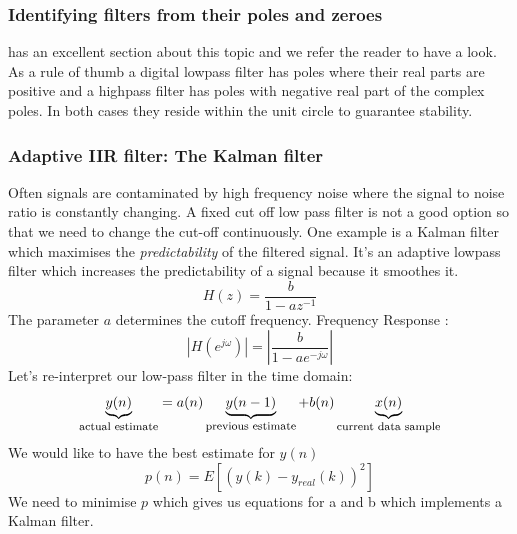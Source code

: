 \documentclass[12pt,a4paper]{article}
\begin{document}
\subsubsection{Identifying filters from their poles and zeroes}
\citet[pp.333]{Proakis1996} has an excellent section about this topic
and we refer the reader to have a look. As a rule of thumb a digital
lowpass filter has poles where their real parts are positive and a
highpass filter has poles with negative real part of the complex
poles. In both cases they reside within the unit circle to guarantee
stability.


\subsubsection{Adaptive IIR filter: The Kalman filter}
Often signals are contaminated by high frequency noise where the
signal to noise ratio is constantly changing.  A fixed cut off low
pass filter is not a good option so that we need to change the cut-off continuously.
One example is a Kalman filter which maximises the
\textsl{predictability} of the filtered signal. It's an adaptive lowpass filter
which increases the predictability of a signal because it smoothes it.
\begin{equation} 
H(z) = \frac{b}{1 - a z^{-1}}
\end{equation}
The parameter $a$ determines the cutoff frequency.
Frequency Response :
\begin{equation} 
|H(e^{j \omega}) | = |\frac{b}{1 - a e^{-j \omega}}| 
\end{equation}
Let's re-interpret our low-pass filter in the time domain:
\begin{equation} 
\underbrace{y(n)}_{\mbox {\footnotesize actual estimate}} = a(n) \underbrace{y(n - 1)}_{\mbox{\footnotesize previous estimate}} + b(n)\underbrace{x(n)}_{\mbox{\footnotesize current data sample}} 
\end{equation}
We would like to have the best estimate for $y(n)$
\begin{equation} 
p(n) = E[ \left( y (k) - y_{real} (k)\right)^{2}] 
\end{equation}
We need to minimise $p$ which gives us equations for a and b which
implements a Kalman filter.




\end{document}
